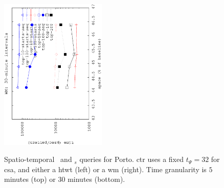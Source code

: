 \begin{figure}[!ht]
\begin{center}
			{\includegraphics[angle=-90,width=0.45\textwidth]{figures_synt/porto_st_topk_wm_30.eps}}
			
		\end{center}
		\vspace{-0.3cm}
		\caption{Spatio-temporal {\topK\ and \topK$_s$} queries for Porto. \acrshort{ctr} uses a fixed $t_{\Psi}=32$ for \acrlong{csa}, 
			and either a \acrlong{htwt} (left) or a \acrlong{wm} (right). 
			Time granularity is $5$ minutes (top) or $30$ minutes (bottom). 
		}
		\label{fig:portost.tk}
		\vspace{-0.3cm}
	\end{figure}






